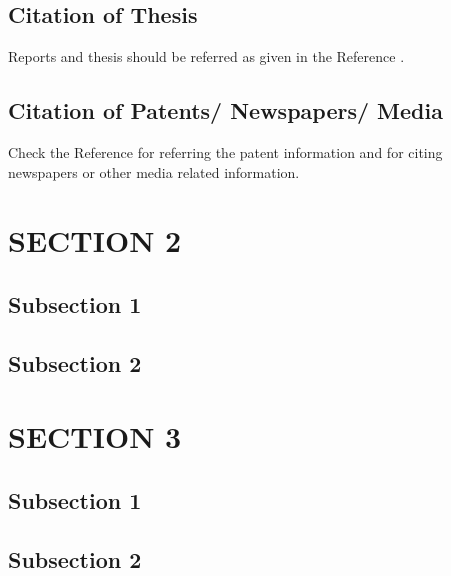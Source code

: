 \subsection{Citation of Thesis}
Reports and thesis should be referred as given in the Reference \cite{thesis}.
\subsection{Citation of Patents/ Newspapers/ Media}
Check the Reference \cite{patent} for referring the patent information and \cite{newspaper} for citing newspapers or other media related information.


\section{\uppercase{Section 2}}

\subsection{Subsection 1}

\subsection{Subsection 2}

\section{\uppercase{Section 3}}

\subsection{Subsection 1}

\subsection{Subsection 2}